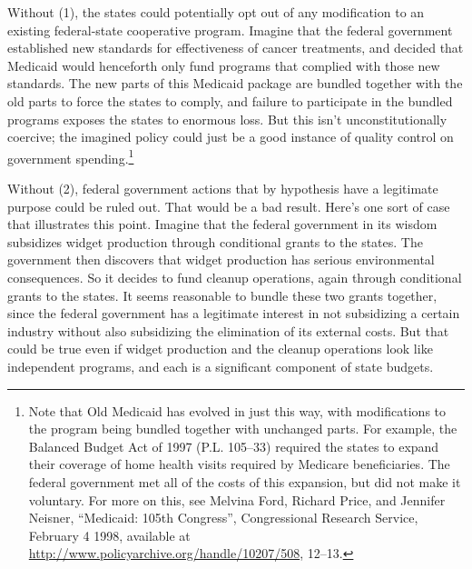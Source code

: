 \documentclass[
  10pt,
  letterpaper,
  DIV=11,
  numbers=noendperiod,
  twoside]{scrartcl}
\begin{document}
Without (1), the states could potentially opt out of any modification to
an existing federal-state cooperative program. Imagine that the federal
government established new standards for effectiveness of cancer
treatments, and decided that Medicaid would henceforth only fund
programs that complied with those new standards. The new parts of this
Medicaid package are bundled together with the old parts to force the
states to comply, and failure to participate in the bundled programs
exposes the states to enormous loss. But this isn't unconstitutionally
coercive; the imagined policy could just be a good instance of quality
control on government spending.\footnote{Note that Old Medicaid has
  evolved in just this way, with modifications to the program being
  bundled together with unchanged parts. For example, the Balanced
  Budget Act of 1997 (P.L. 105--33) required the states to expand their
  coverage of home health visits required by Medicare beneficiaries. The
  federal government met all of the costs of this expansion, but did not
  make it voluntary. For more on this, see Melvina Ford, Richard Price,
  and Jennifer Neisner, ``Medicaid: 105th Congress'', Congressional
  Research Service, February 4 1998, available at
  \url{http://www.policyarchive.org/handle/10207/508}, 12--13.}

Without (2), federal government actions that by hypothesis have a
legitimate purpose could be ruled out. That would be a bad result.
Here's one sort of case that illustrates this point. Imagine that the
federal government in its wisdom subsidizes widget production through
conditional grants to the states. The government then discovers that
widget production has serious environmental consequences. So it decides
to fund cleanup operations, again through conditional grants to the
states. It seems reasonable to bundle these two grants together, since
the federal government has a legitimate interest in not subsidizing a
certain industry without also subsidizing the elimination of its
external costs. But that could be true even if widget production and the
cleanup operations look like independent programs, and each is a
significant component of state budgets.
\end{document}

